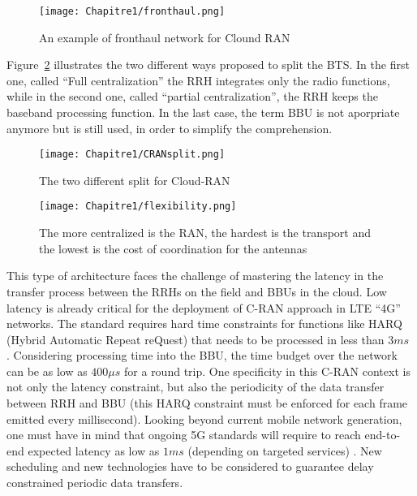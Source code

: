   \begin{figure}[h]
      \begin{center}
      \texttt{[image: Chapitre1/fronthaul.png]}
      \end{center}
      \caption{An example of fronthaul network for Clound RAN}\label{fig:fronthaul}
      \end{figure}
      
      Figure~\ref{fig:CRANsplit} illustrates the two different ways proposed to split the BTS. In the first one, called ``Full centralization'' the RRH integrates only the radio functions, while in the second one, called ``partial centralization'', the RRH keeps the baseband processing function. In the last case, the term BBU is not aporpriate anymore but is still used, in order to simplify the comprehension.
   \begin{figure}[h]
      \begin{center}
      \texttt{[image: Chapitre1/CRANsplit.png]}
      \end{center}
      \caption{The two different split for Cloud-RAN}\label{fig:CRANsplit}
      \end{figure}
      \begin{figure}[h]
      \begin{center}
      \texttt{[image: Chapitre1/flexibility.png]}
      \end{center}
      \caption{The more centralized is the RAN, the hardest is the transport and the lowest is the cost of coordination for the antennas}\label{fig:flexibility}
      \end{figure}
       
This type of architecture faces the challenge of mastering the latency in the transfer process between the RRHs on the field and BBUs in the cloud. Low latency is already critical for the deployment of C-RAN approach in LTE “4G” networks. The standard requires hard time constraints for functions like HARQ (Hybrid Automatic Repeat reQuest) that needs to be processed in less than $3ms$ \cite{bouguen2012lte}. Considering processing time into the BBU, the time budget over the network can be as low as $400\mu s$ for a round trip. One specificity in this C-RAN context is not only the latency constraint, but also the periodicity of the data transfer between RRH and BBU (this HARQ constraint must be enforced for each frame emitted every millisecond). Looking beyond current mobile network generation, one must have in mind that ongoing 5G standards will require to reach end-to-end expected latency as low as $1ms$ (depending on targeted services) \cite{boccardi2014five}. New scheduling and new technologies have to be considered to guarantee delay constrained periodic data transfers. 


